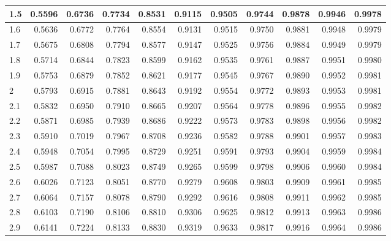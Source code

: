 \documentclass[
  11pt,
]{book}
\theoremstyle{definition}
\theoremstyle{definition}
\theoremstyle{definition}
\theoremstyle{definition}
\theoremstyle{remark}
\begin{document}
\begin{table}
\begin{tabular}[t]{l|r|r|r|r|r|r|r|r|r|r}
\hline
1.5 & 0.5596 & 0.6736 & 0.7734 & 0.8531 & 0.9115 & 0.9505 & 0.9744 & 0.9878 & 0.9946 & 0.9978\\
\hline
1.6 & 0.5636 & 0.6772 & 0.7764 & 0.8554 & 0.9131 & 0.9515 & 0.9750 & 0.9881 & 0.9948 & 0.9979\\
\hline
1.7 & 0.5675 & 0.6808 & 0.7794 & 0.8577 & 0.9147 & 0.9525 & 0.9756 & 0.9884 & 0.9949 & 0.9979\\
\hline
1.8 & 0.5714 & 0.6844 & 0.7823 & 0.8599 & 0.9162 & 0.9535 & 0.9761 & 0.9887 & 0.9951 & 0.9980\\
\hline
1.9 & 0.5753 & 0.6879 & 0.7852 & 0.8621 & 0.9177 & 0.9545 & 0.9767 & 0.9890 & 0.9952 & 0.9981\\
\hline
2 & 0.5793 & 0.6915 & 0.7881 & 0.8643 & 0.9192 & 0.9554 & 0.9772 & 0.9893 & 0.9953 & 0.9981\\
\hline
2.1 & 0.5832 & 0.6950 & 0.7910 & 0.8665 & 0.9207 & 0.9564 & 0.9778 & 0.9896 & 0.9955 & 0.9982\\
\hline
2.2 & 0.5871 & 0.6985 & 0.7939 & 0.8686 & 0.9222 & 0.9573 & 0.9783 & 0.9898 & 0.9956 & 0.9982\\
\hline
2.3 & 0.5910 & 0.7019 & 0.7967 & 0.8708 & 0.9236 & 0.9582 & 0.9788 & 0.9901 & 0.9957 & 0.9983\\
\hline
2.4 & 0.5948 & 0.7054 & 0.7995 & 0.8729 & 0.9251 & 0.9591 & 0.9793 & 0.9904 & 0.9959 & 0.9984\\
\hline
2.5 & 0.5987 & 0.7088 & 0.8023 & 0.8749 & 0.9265 & 0.9599 & 0.9798 & 0.9906 & 0.9960 & 0.9984\\
\hline
2.6 & 0.6026 & 0.7123 & 0.8051 & 0.8770 & 0.9279 & 0.9608 & 0.9803 & 0.9909 & 0.9961 & 0.9985\\
\hline
2.7 & 0.6064 & 0.7157 & 0.8078 & 0.8790 & 0.9292 & 0.9616 & 0.9808 & 0.9911 & 0.9962 & 0.9985\\
\hline
2.8 & 0.6103 & 0.7190 & 0.8106 & 0.8810 & 0.9306 & 0.9625 & 0.9812 & 0.9913 & 0.9963 & 0.9986\\
\hline
2.9 & 0.6141 & 0.7224 & 0.8133 & 0.8830 & 0.9319 & 0.9633 & 0.9817 & 0.9916 & 0.9964 & 0.9986\\
\hline
\end{tabular}
\end{table}
\end{document}
